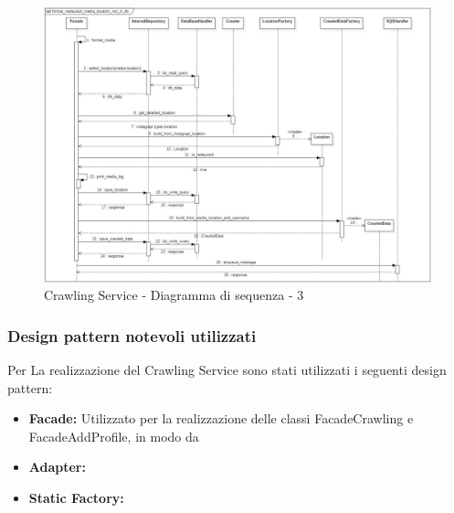 \begin{figure}[!h]
    \centering
    \includegraphics[scale=0.35]{Contenuto/Immagini/seq3-CS.JPG}
    \caption{Crawling Service - Diagramma di sequenza - 3}
\end{figure}

\subsubsection{Design pattern notevoli utilizzati}
Per La realizzazione del Crawling Service sono stati utilizzati i seguenti design pattern:
\begin{itemize}
    \item \textbf{Facade:} Utilizzato per la realizzazione delle classi FacadeCrawling e FacadeAddProfile, in modo da 
    \item \textbf{Adapter:}
    \item \textbf{Static Factory:}
\end{itemize}